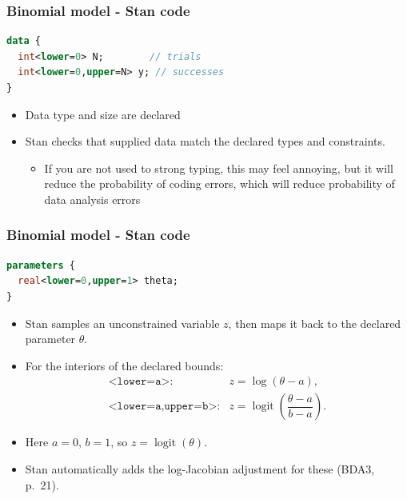\documentclass[10pt]{beamer}
\begin{document}
\begin{frame}[fragile]

\frametitle{Binomial model - Stan code}

  {\small
  \begin{lstlisting}[language=Stan]
data {
  int<lower=0> N;        // trials
  int<lower=0,upper=N> y; // successes
}
\end{lstlisting}}

  \begin{itemize}
  \item Data type and size are declared
  \item Stan checks that supplied data match the declared types and constraints.
    \begin{itemize}
    \item<2-> If you are not used to strong typing, this may
      feel annoying, but it will reduce the probability of coding
      errors, which will reduce probability of data analysis errors
    \end{itemize}
  \end{itemize}
\end{frame}


\begin{frame}[fragile]

\frametitle{Binomial model - Stan code}

  {\small
\begin{lstlisting}[language=Stan]
parameters {
  real<lower=0,upper=1> theta;
}
\end{lstlisting}}

  \begin{itemize}
  \item Stan samples an unconstrained variable $z$, then maps it back
    to the declared parameter $\theta$.
  \item For the interiors of the declared bounds:
    \[
    \begin{array}{ll}
    \texttt{<lower=a>}: & z=\log(\theta-a),\\[6pt]
    \texttt{<lower=a,upper=b>}: &
    z=\operatorname{logit}\!\left(\dfrac{\theta-a}{b-a}\right).
    \end{array}
    \]
  \item Here $a=0$, $b=1$, so $z=\operatorname{logit}(\theta)$.
  \item<2-> Stan automatically adds the log-Jacobian adjustment for
    these  (BDA3, p.\ 21).
  \end{itemize}
\end{frame}
\end{document}
